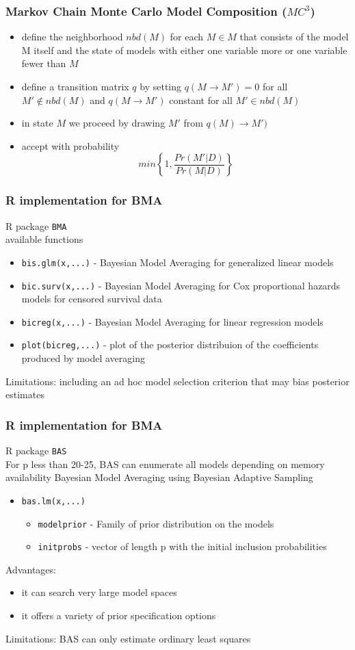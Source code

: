 \documentclass[hyperref={pdfpagelabels=true}]{beamer}
\begin{document}
\begin{frame}
\frametitle{Markov Chain Monte Carlo Model Composition ($MC^{3}$)}
\begin{itemize}
\item define the neighborhood $nbd(M)$ for each $M \in M$ that consists of the model M itself and the state of models with either one variable more or one variable fewer than $M$
\item define a transition matrix $q$ by setting $q(M \rightarrow M')=0$ for all $M' \notin nbd(M)$ and $q(M \rightarrow M')$ constant for all $M' \in nbd(M)$
\item in state $M$ we proceed by drawing $M'$ from $q(M) \rightarrow M')$
\item accept with probability 
\[
min\left\{1,\frac{Pr(M'|D)}{Pr(M|D)}\right\}
\]
\end{itemize}
\end{frame}

\begin{frame}
\frametitle{R implementation for BMA}
R package \texttt{BMA} \\
available functions 
\begin{itemize}
\item \texttt{bis.glm(x,...)} - Bayesian Model Averaging for generalized linear models
\item \texttt{bic.surv(x,...)} - Bayesian Model Averaging for Cox proportional hazards models for censored survival data
\item \texttt{bicreg(x,...)} - Bayesian Model Averaging for linear regression models
\item \texttt{plot(bicreg,...)} -  plot of the posterior distribuion of the coefficients produced by model averaging
\end{itemize}
Limitations: including an ad hoc model selection criterion that may bias posterior estimates
\end{frame}%

\begin{frame}
\frametitle{R implementation for BMA}
R package \texttt{BAS} \\
For p less than 20-25, BAS can enumerate all models depending on memory availability
Bayesian Model Averaging using Bayesian Adaptive Sampling
\begin{itemize}
\item \texttt{bas.lm(x,...)}
\begin{itemize}
\item \texttt{modelprior} - Family of prior distribution on the models
\item \texttt{initprobs} - vector of length p with the initial inclusion probabilities
\end{itemize}
\end{itemize}
Advantages: 
\begin{itemize} 
\item it can search very large model spaces
\item it offers a variety of prior specification options
\end{itemize}
Limitations: BAS can only estimate ordinary least squares
\end{frame}
\end{document}
